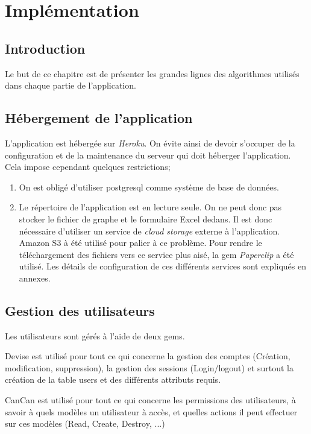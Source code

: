 \clearpage
\section{Implémentation}
\subsection{Introduction}
Le but de ce chapitre est de présenter les grandes lignes des algorithmes utilisés dans chaque partie de l'application. 
\subsection{Hébergement de l'application}
L'application est hébergée sur \textit{Heroku}. On évite ainsi de devoir s'occuper de la configuration et de la maintenance du serveur qui doit héberger l'application. Cela impose cependant quelques restrictions;
\begin{enumerate}
  \item On est obligé d'utiliser postgresql comme système de base de données.
  \item Le répertoire de l'application est en lecture seule. On ne peut donc pas stocker le fichier de graphe et le formulaire Excel dedans. Il est donc nécessaire d'utiliser un service de \textit{cloud storage} externe à l'application. Amazon S3 à été utilisé pour palier à ce problème. Pour rendre le téléchargement des fichiers vers ce service plus aisé, la gem \textit{Paperclip} a été utilisé. Les détails de configuration de ces différents services sont expliqués en annexes. 
\end{enumerate}
\subsection{Gestion des utilisateurs}
\label{user_mgmt}
Les utilisateurs sont gérés à l'aide de deux gems. 

Devise est utilisé pour tout ce qui concerne la gestion des comptes (Création, modification, suppression), la gestion des sessions (Login/logout) et surtout la création de la table users et des différents attributs requis.

CanCan est utilisé pour tout ce qui concerne les permissions des utilisateurs, à savoir à quels modèles un utilisateur à accès, et quelles actions il peut effectuer sur ces modèles (Read, Create, Destroy, ...) 

